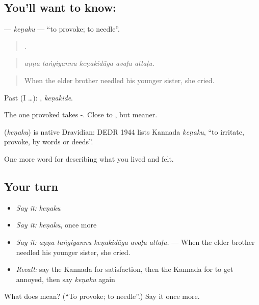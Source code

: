 \subsection*{You'll want to know: }
\textbf{} — \emph{keṇaku} — \textquotedblleft{}to provoke; to needle\textquotedblright{}.

\begin{quote}
    .
\end{quote}

\begin{quote}
\emph{aṇṇa taṅgiyannu keṇakidāga avaḷu attaḷu.}
\end{quote}

\begin{quote}
When the elder brother needled his younger sister, she cried.
\end{quote}

Past (I …): , \emph{keṇakide}.

The one provoked takes -. Close to , but meaner.

\begin{cousinweb}
\textbf{} (\emph{keṇaku}) is native Dravidian: DEDR 1944 lists Kannada \emph{keṇaku}, \textquotedblleft{}to irritate, provoke, by words or deeds\textquotedblright{}.
\end{cousinweb}

\begin{grammarlens}[title={What you've built}]
One more word for describing what you lived and felt.
\end{grammarlens}

\subsection*{Your turn}
\begin{itemize}
\raggedright
  \item \emph{Say it:} \emph{keṇaku}
  \item \emph{Say it:} \emph{keṇaku}, once more
  \item \emph{Say it:} \emph{aṇṇa taṅgiyannu keṇakidāga avaḷu attaḷu.} — When the elder brother needled his younger sister, she cried.
  \item \emph{Recall:} say the Kannada for satisfaction, then the Kannada for to get annoyed, then say \emph{keṇaku} again
\end{itemize}

\begin{tcolorbox}[breakable,colback=teal!4,colframe=teal!35!black,title={Before you move on}]
What does  mean? (\textquotedblleft{}To provoke; to needle\textquotedblright{}.) Say it once more.
\end{tcolorbox}
